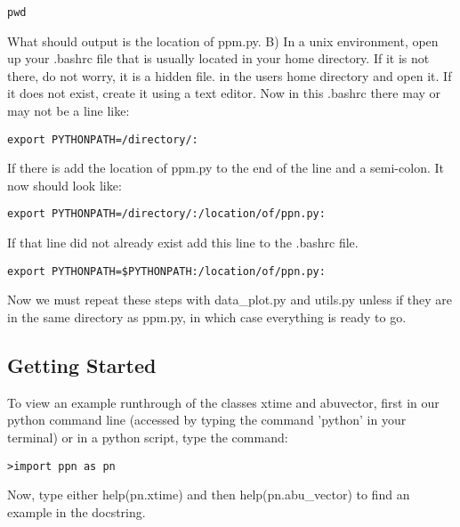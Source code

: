 \begin{verbatim}
pwd
\end{verbatim}

What should output is the location of ppm.py.
\newline
B) In a unix environment, open up your .bashrc file that is usually located in your home directory.  If it is not there, do not worry, it is a hidden file.
in the users home directory and open it.  If it does not exist, create it using a text editor.
Now in this .bashrc there may or may not be a line like:

\begin{verbatim}
export PYTHONPATH=/directory/:
\end{verbatim}

If there is add the location of ppm.py to the end of the line and a semi-colon.  It now should look like:

\begin{verbatim}
export PYTHONPATH=/directory/:/location/of/ppn.py:
\end{verbatim}

If that line did not already exist add this line to the .bashrc file.

\begin{verbatim}
export PYTHONPATH=$PYTHONPATH:/location/of/ppn.py:
\end{verbatim}

Now we must repeat these steps with data\_plot.py and utils.py unless if they are in the same directory as ppm.py, in which case everything is ready to go.


\subsection{Getting Started}
To view an example runthrough of the classes xtime and abuvector,
first in our python command line (accessed by typing the command 'python' in your terminal) or in a python script,
type the command:
\begin{verbatim}
>import ppn as pn
\end{verbatim}
Now, type either help(pn.xtime) and then help(pn.abu\_vector) to find an example in the docstring.

